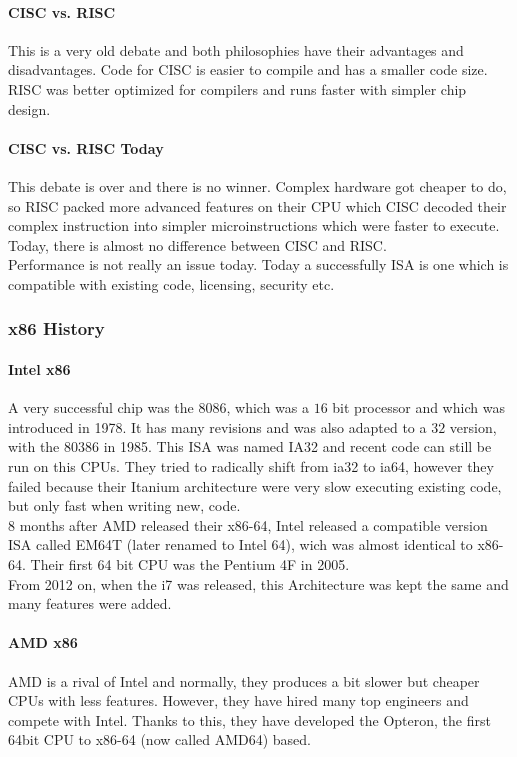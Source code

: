 \paragraph{CISC vs. RISC}
This is a very old debate and both philosophies have their advantages and disadvantages. Code for CISC is easier to compile and has a smaller code size. RISC was better optimized for compilers and runs faster with simpler chip design.

\paragraph{CISC vs. RISC Today}
This debate is over and there is no winner. Complex hardware got cheaper to do, so RISC packed more advanced features on their CPU which CISC decoded their complex instruction into simpler microinstructions which were faster to execute. Today, there is almost no difference between CISC and RISC.\\
Performance is not really an issue today. Today a successfully ISA is one which is compatible with existing code, licensing, security etc.

\subsubsection{x86 History}
\paragraph{Intel x86}
A very successful chip was the $8086$, which was a $16$ bit processor and which was introduced in 1978. It has many revisions and was also adapted to a $32$ version, with the $80386$ in 1985. This ISA was named IA32 and recent code can still be run on this CPUs. They tried to radically shift from ia32 to ia64, however they failed because their Itanium architecture were very slow executing existing code, but only fast when writing new, code.\\
$8$ months after AMD released their x86-64, Intel released a compatible version ISA called EM64T (later renamed to Intel 64), wich was almost identical to x86-64. Their first 64 bit CPU was the Pentium 4F in 2005.\\
From 2012 on, when the i7 was released, this Architecture was kept the same and many features were added.

\paragraph{AMD x86}
AMD is a rival of Intel and normally, they produces a bit slower but cheaper CPUs with less features. However, they have hired many top engineers and compete with Intel. Thanks to this, they have developed the Opteron, the first 64bit CPU to x86-64 (now called AMD64) based.

